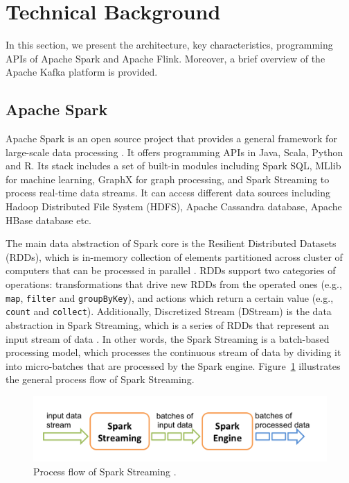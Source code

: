 \documentclass[]{article}
\begin{document}
\section{Technical Background}
\label{sec:sec2}
 In this section, we present the architecture, key characteristics, programming APIs  of Apache Spark and Apache Flink. Moreover, a brief overview of the Apache Kafka platform is  provided.

\subsection{Apache Spark}

\par Apache Spark is an open source project that provides a general framework for large-scale data processing \cite{spark}. It offers programming APIs in Java, Scala, Python and R. Its stack includes a set of built-in modules including Spark SQL, MLlib for machine learning, GraphX for graph processing, and Spark Streaming to process real-time data streams. It can access different data sources including Hadoop Distributed File System (HDFS), Apache Cassandra database, Apache HBase database etc.

\par The main data abstraction of Spark core is the Resilient Distributed Datasets (RDDs), which is in-memory collection of elements partitioned across cluster of computers that can be processed in parallel \cite{rdd}. RDDs support two categories of operations: transformations that drive new RDDs from the operated ones (e.g., \texttt{map}, \texttt{filter} and \texttt{groupByKey}), and actions which return a certain value (e.g., \texttt{count} and \texttt{collect}). Additionally, Discretized Stream (DStream) is the data abstraction in Spark Streaming, which is a series of RDDs that represent an input stream of data \cite{spark_streaming}. In other words, the Spark Streaming is a batch-based processing model, which processes the continuous stream of data by dividing it into micro-batches that are  processed by the Spark engine. Figure~\ref{fig:spark} illustrates the general process flow of Spark Streaming. 


\begin{figure}[h]

  \centering
    \includegraphics[width=.9\textwidth, height=.3\textheight]{streaming-flow.png}
     \caption{ Process flow of Spark Streaming \cite{spark_streaming}.}
      \label{fig:spark}
\end{figure} 
\end{document}
